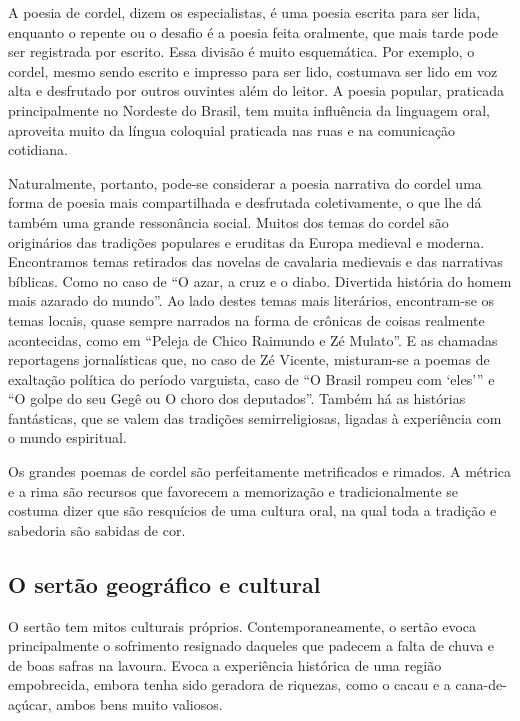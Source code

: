 A poesia de cordel, dizem os especialistas, é uma poesia escrita para
ser lida, enquanto o repente ou o desafio é a poesia feita oralmente,
que mais tarde pode ser registrada por escrito. Essa divisão é muito
esquemática. Por exemplo, o cordel, mesmo sendo escrito e impresso para
ser lido, costumava ser lido em voz alta e desfrutado por outros
ouvintes além do leitor. A poesia popular, praticada principalmente no
Nordeste do Brasil, tem muita influência da linguagem oral, aproveita
muito da língua coloquial praticada nas ruas e na comunicação
cotidiana. 

Naturalmente, portanto, pode-se considerar a poesia narrativa do cordel
uma forma de poesia mais compartilhada e desfrutada coletivamente, o
que lhe dá também uma grande ressonância social. Muitos dos temas do
cordel são originários das tradições populares e eruditas da Europa
medieval e moderna. Encontramos temas retirados das novelas de
cavalaria medievais e das narrativas bíblicas. Como no caso de
``O azar, a cruz e o diabo. Divertida história do
homem mais azarado do mundo''. Ao lado destes temas
mais literários, encontram-se os temas locais, quase sempre narrados na
forma de crônicas de coisas realmente acontecidas, como em
``Peleja de Chico Raimundo e Zé
Mulato''. E as chamadas reportagens jornalísticas que,
no caso de Zé Vicente, misturam-se a poemas de exaltação política do
período varguista, caso de ``O Brasil rompeu com
`eles''' e ``O golpe do seu Gegê ou O choro dos
deputados''. Também há as histórias fantásticas, que
se valem das tradições semirreligiosas, ligadas à experiência com o
mundo espiritual. 

Os grandes poemas de cordel são perfeitamente metrificados e rimados. A
métrica e a rima são recursos que favorecem a memorização e
tradicionalmente se costuma dizer que são resquícios de uma cultura
oral, na qual toda a tradição e sabedoria são sabidas de cor. 


\subsection{O sertão geográfico e cultural}

O sertão tem mitos culturais próprios. Contemporaneamente, o sertão
evoca principalmente o sofrimento resignado daqueles que padecem a
falta de chuva e de boas safras na lavoura. Evoca a experiência
histórica de uma região empobrecida, embora tenha sido geradora de
riquezas, como o cacau e a cana-de-açúcar, ambos bens muito valiosos. 

